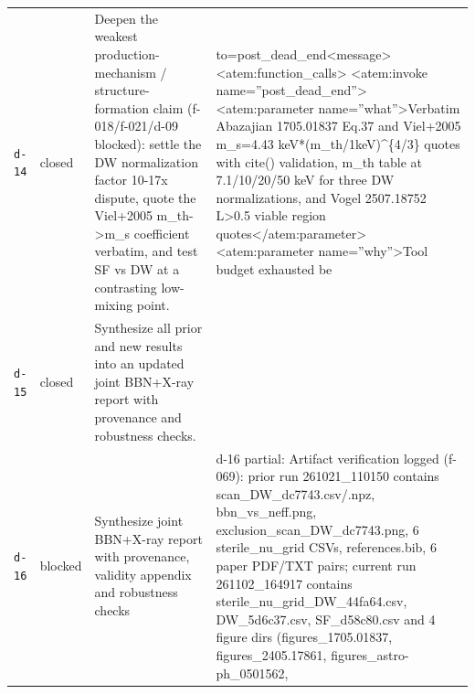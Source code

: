 \documentclass[11pt,a4paper]{article}
\begin{document}
\begin{longtable}{@{}p{}p{}p{}p{}@{}}
$$\texttt{d-14} & closed & Deepen the weakest production-mechanism / structure-formation claim (f-018/f-021/d-09 blocked): settle the DW normalization factor 10-17x dispute, quote the Viel+2005 m\_th-\textgreater{}m\_s coefficient verbatim, and test SF vs DW at a contrasting low-mixing point. & to=post\_dead\_end\textless{}\textbar{}message\textbar{}\textgreater{}\textless{}atem:function\_calls\textgreater{}
\textless{}atem:invoke name=''post\_dead\_end''\textgreater{}
\textless{}atem:parameter name=''what''\textgreater{}Verbatim Abazajian 1705.01837 Eq.37 and Viel+2005 m\_s=4.43 keV*(m\_th/1keV)\textasciicircum{}\{4/3\} quotes with cite() validation, m\_th table at 7.1/10/20/50 keV for three DW normalizations, and Vogel 2507.18752 L\textgreater{}0.5 viable region quotes\textless{}/atem:parameter\textgreater{}
\textless{}atem:parameter name=''why''\textgreater{}Tool budget exhausted be \\
\texttt{d-15} & closed & Synthesize all prior and new results into an updated joint BBN+X-ray report with provenance and robustness checks. &  \\
\texttt{d-16} & blocked & Synthesize joint BBN+X-ray report with provenance, validity appendix and robustness checks & d-16 partial: Artifact verification logged (f-069): prior run 261021\_110150 contains scan\_DW\_dc7743.csv/.npz, bbn\_vs\_neff.png, exclusion\_scan\_DW\_dc7743.png, 6 sterile\_nu\_grid CSVs, references.bib, 6 paper PDF/TXT pairs; current run 261102\_164917 contains sterile\_nu\_grid\_DW\_44fa64.csv, DW\_5d6c37.csv, SF\_d58c80.csv and 4 figure dirs (figures\_1705.01837, figures\_2405.17861, figures\_astro-ph\_0501562,  \\
\bottomrule\end{longtable}
\end{document}

